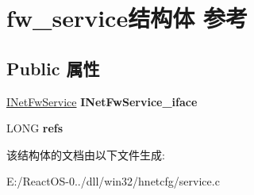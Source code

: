 \hypertarget{structfw__service}{}\section{fw\+\_\+service结构体 参考}
\label{structfw__service}
\subsection*{Public 属性}
\begin{DoxyCompactItemize}
\item 
\mbox{\label{structfw__service_a9145d484d3127bb0bd63c023d2a1b10d}} 
\hyperlink{interface_i_net_fw_service}{I\+Net\+Fw\+Service} {\bfseries I\+Net\+Fw\+Service\+\_\+iface}
\item 
\mbox{\label{structfw__service_afe955f767f87f63c48039f3bed2059ab}} 
L\+O\+NG {\bfseries refs}
\end{DoxyCompactItemize}


该结构体的文档由以下文件生成\+:\begin{DoxyCompactItemize}
\item 
E\+:/\+React\+O\+S-\/0../dll/win32/hnetcfg/service.\+c\end{DoxyCompactItemize}
